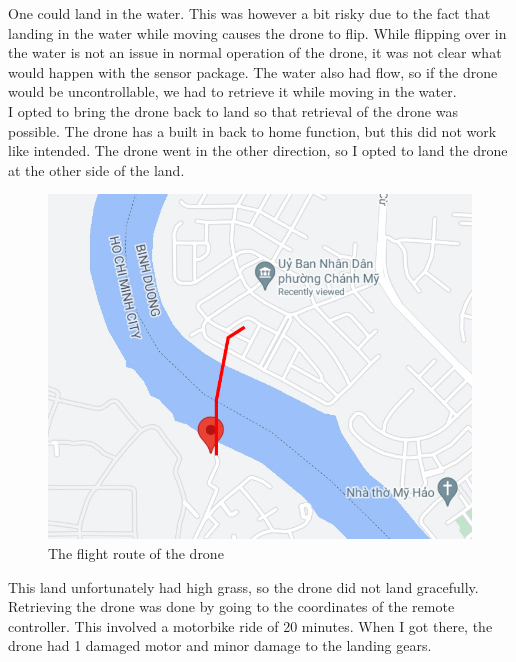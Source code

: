 One could land in the water. This was however a bit risky due to the fact that landing in the water while moving causes the drone to flip. While flipping over in the water is not an issue in normal operation of the drone, it was not clear what would happen with the sensor package. The water also had flow, so if the drone would be uncontrollable, we had to retrieve it while moving in the water.\\

I opted to bring the drone back to land so that retrieval of the drone was possible. The drone has a built in back to home function, but this did not work like intended. The drone went in the other direction, so I opted to land the drone at the other side of the land.
\newpage

\begin{figure}[h]
\centering
\includegraphics[scale=1.2]{080_testing/flights/31_flight.jpg}
\caption{The flight route of the drone}
\end{figure}

This land unfortunately had high grass, so the drone did not land gracefully. Retrieving the drone was done by going to the coordinates of the remote controller. This involved a motorbike ride of 20 minutes. When I got there, the drone had 1 damaged motor and minor damage to the landing gears.

